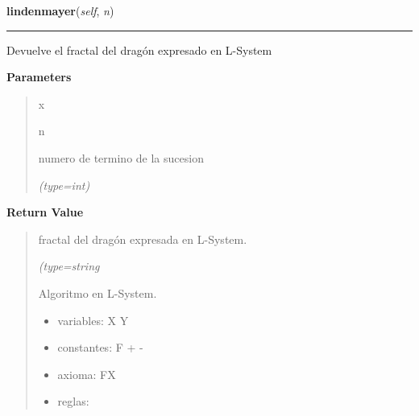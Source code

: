     \label{FractalZE:dragon:Dragon:lindenmayer}

    \vspace{0.5ex}

\hspace{.8\funcindent}\begin{boxedminipage}{\funcwidth}

    \raggedright \textbf{lindenmayer}(\textit{self}, \textit{n})

    \vspace{-1.5ex}

    \rule{\textwidth}{0.5\fboxrule}
\setlength{\parskip}{2ex}
    Devuelve el fractal del dragón expresado en L-System

\setlength{\parskip}{1ex}
      \textbf{Parameters}
      \vspace{-1ex}

      \begin{quote}
        \begin{Ventry}{x}

          \item[n]

          numero de termino de la sucesion

            {\it (type=int)}

        \end{Ventry}

      \end{quote}

      \textbf{Return Value}
    \vspace{-1ex}

      \begin{quote}
      fractal del dragón expresada en L-System.

      {\it (type=string

      Algoritmo en L-System.

      \begin{itemize}
      \setlength{\parskip}{0.6ex}
        \item variables: X Y

        \item constantes: F + -

        \item axioma: FX

        \item reglas:


\end{itemize}}
\end{quote}
\end{boxedminipage}
